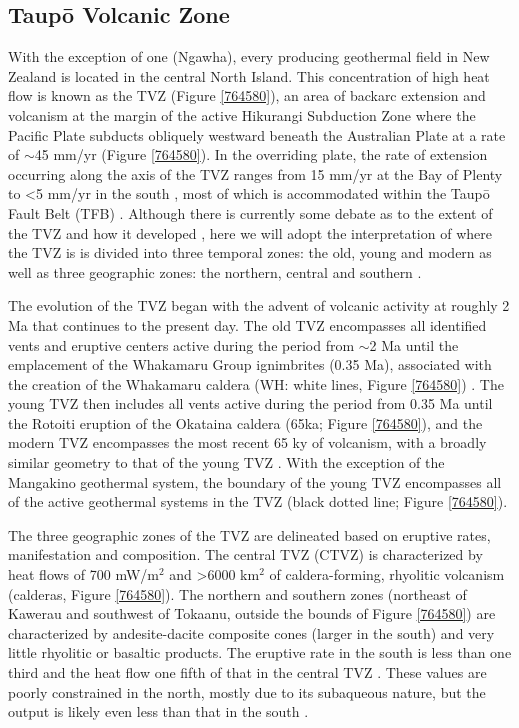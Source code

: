 \subsection{Taup\={o} Volcanic Zone}
With the exception of one (Ngawha), every producing geothermal field in New Zealand is located in the central North Island. This concentration of high heat flow is known as the \acrfull{TVZ} (Figure \ref{764580}), an area of backarc extension and volcanism at the margin of the active Hikurangi Subduction Zone where the Pacific Plate subducts obliquely westward beneath the Australian Plate at a rate of $\sim$45 mm/yr \citep{Cole_1981,Wilson_1995,DeMets_1994} (Figure \ref{764580}). In the overriding plate, the rate of extension occurring along the axis of the \acrshort{TVZ} ranges from 15 mm/yr at the Bay of Plenty to \textless 5 mm/yr in the south \cite{Wallace_2004}, most of which is accommodated within the Taup\={o} Fault Belt (TFB) \cite{Villamor_2011}. Although there is currently some debate as to the extent of the \acrshort{TVZ} and how it developed \citep[e.g.][]{Stern_2011,Wilson_1995}, here we will adopt the interpretation of \citet{Wilson_2016} where the \acrshort{TVZ} is is divided into three temporal zones: the old, young and modern as well as three geographic zones: the northern, central and southern \citep{Wilson_1995,Wilson_2016}.

The evolution of the \acrshort{TVZ} began with the advent of volcanic activity at roughly 2 Ma that continues to the present day. The old \acrshort{TVZ} encompasses all identified vents and eruptive centers active during the period from $\sim$2 Ma until the emplacement of the Whakamaru Group ignimbrites (0.35 Ma), associated with the creation of the Whakamaru caldera (WH: white lines, Figure \ref{764580}) \citep{Wilson_1995}. The young \acrshort{TVZ} then includes all vents active during the period from 0.35 Ma until the Rotoiti eruption of the Okataina caldera (65ka; Figure \ref{764580}), and the modern \acrshort{TVZ} encompasses the most recent 65 ky of volcanism, with a broadly similar geometry to that of the young \acrshort{TVZ} \citep{Wilson_1995,Wilson_2016}. With the exception of the Mangakino geothermal system, the boundary of the young \acrshort{TVZ} encompasses all of the active geothermal systems in the \acrshort{TVZ} (black dotted line; Figure \ref{764580}).

The three geographic zones of the \acrshort{TVZ} are delineated based on eruptive rates, manifestation and composition. The central \acrshort{TVZ} (CTVZ) is characterized by heat flows of 700 mW/m$^2$ \citep{Bibby_1995} and \textgreater6000 km$^2$ of caldera-forming, rhyolitic volcanism \citep{Wilson_1995} (calderas, Figure \ref{764580}). The northern and southern zones (northeast of Kawerau and southwest of Tokaanu, outside the bounds of Figure \ref{764580}) are characterized by andesite-dacite composite cones (larger in the south) and very little rhyolitic or basaltic products. The eruptive rate in the south is less than one third and the heat flow one fifth of that in the central \acrshort{TVZ} \citep{Wilson_2016}. These values are poorly constrained in the north, mostly due to its subaqueous nature, but the output is likely even less than that in the south \citep{Wilson_2016}.

